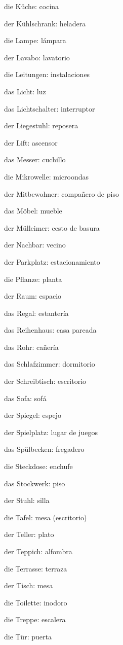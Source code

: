 \begin{multicols}{2}
\begin{myitemize}
\item die Küche: cocina
\item der Kühlschrank: heladera
\item die Lampe: lámpara
\item der Lavabo: lavatorio
\item die Leitungen: instalaciones
\item das Licht: luz
\item das Lichtschalter: interruptor
\item der Liegestuhl: reposera
\item der Lift: ascensor
\item das Messer: cuchillo
\item die Mikrowelle: microondas
\item der Mitbewohner: compañero de piso
\item das Möbel: mueble
\item der Mülleimer: cesto de basura
\item der Nachbar: vecino
\item der Parkplatz: estacionamiento
\item die Pflanze: planta
\item der Raum: espacio
\item das Regal: estantería
\item das Reihenhaus: casa pareada
\item das Rohr: cañería
\item das Schlafzimmer: dormitorio
\item der Schreibtisch: escritorio
\item das Sofa: sofá
\item der Spiegel: espejo
\item der Spielplatz: lugar de juegos
\item das Spülbecken: fregadero
\item die Steckdose: enchufe
\item das Stockwerk: piso
\item der Stuhl: silla
\item die Tafel: mesa (escritorio)
\item der Teller: plato
\item der Teppich: alfombra
\item die Terrasse: terraza
\item der Tisch: mesa
\item die Toilette: inodoro
\item die Treppe: escalera
\item die Tür: puerta

\end{myitemize}
\end{multicols}
